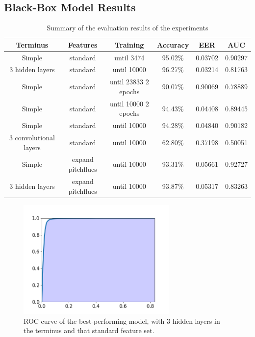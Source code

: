 \documentclass{article}
\begin{document}
		\subsection{Black-Box Model Results}
		\begin{table}[htbp]
			\centering\tiny
			\begin{tabular}{c | c | c | c | c | c}
				Terminus & Features & Training & Accuracy & EER & AUC \\
				\hline
				Simple & standard & until 3474 & 95.02\% & 0.03702 & 0.90297 \\
				3 hidden layers & standard & until 10000 & 96.27\% & 0.03214 & 0.81763 \\
				Simple & standard & until 23833 2 epochs & 90.07\% & 0.90069 & 0.78889 \\
				Simple & standard & until 10000 2 epochs & 94.43\% & 0.04408 & 0.89445 \\
				Simple & standard & until 10000 & 94.28\% & 0.04840 & 0.90182 \\
				3 convolutional layers & standard & until 10000 & 62.80\% & 0.37198 & 0.50051 \\
				Simple & expand pitch\-flucs & until 10000 & 93.31\% & 0.05661 & 0.92727 \\
				3 hidden layers & expand pitch\-flucs & until 10000 & 93.87\% & 0.05317 & 0.83263
			\end{tabular}
			\caption{Summary of the evaluation results of the experiments}
			\label{table:eval-results}
		\end{table}
		\begin{figure}[htbp]
			\centering
			\includegraphics[width=0.7\textwidth]{images/roc_cterm.png}
			\caption{ROC curve of the best-performing model, with 3 hidden layers in the terminus and that standard feature set.}
			\label{fig:roc_cterm}
		\end{figure}
\end{document}
